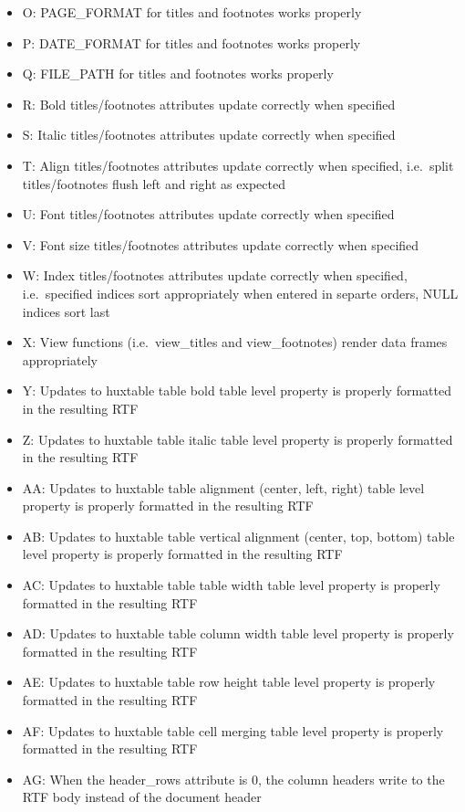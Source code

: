 \documentclass[]{article}
\begin{document}
\begin{itemize}
\item
  O: PAGE\_FORMAT for titles and footnotes works properly
\item
  P: DATE\_FORMAT for titles and footnotes works properly
\item
  Q: FILE\_PATH for titles and footnotes works properly
\item
  R: Bold titles/footnotes attributes update correctly when specified
\item
  S: Italic titles/footnotes attributes update correctly when specified
\item
  T: Align titles/footnotes attributes update correctly when specified,
  i.e.~split titles/footnotes flush left and right as expected
\item
  U: Font titles/footnotes attributes update correctly when specified
\item
  V: Font size titles/footnotes attributes update correctly when
  specified
\item
  W: Index titles/footnotes attributes update correctly when specified,
  i.e.~specified indices sort appropriately when entered in separte
  orders, NULL indices sort last
\item
  X: View functions (i.e.~view\_titles and view\_footnotes) render data
  frames appropriately
\item
  Y: Updates to huxtable table bold table level property is properly
  formatted in the resulting RTF
\item
  Z: Updates to huxtable table italic table level property is properly
  formatted in the resulting RTF
\item
  AA: Updates to huxtable table alignment (center, left, right) table
  level property is properly formatted in the resulting RTF
\item
  AB: Updates to huxtable table vertical alignment (center, top, bottom)
  table level property is properly formatted in the resulting RTF
\item
  AC: Updates to huxtable table table width table level property is
  properly formatted in the resulting RTF
\item
  AD: Updates to huxtable table column width table level property is
  properly formatted in the resulting RTF
\item
  AE: Updates to huxtable table row height table level property is
  properly formatted in the resulting RTF
\item
  AF: Updates to huxtable table cell merging table level property is
  properly formatted in the resulting RTF
\item
  AG: When the header\_rows attribute is 0, the column headers write to
  the RTF body instead of the document header
\end{itemize}
\end{document}
